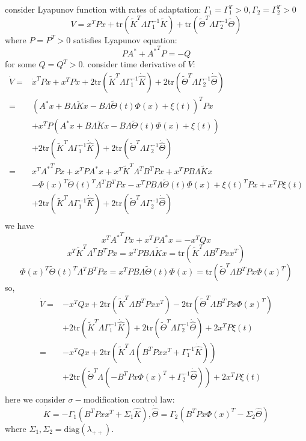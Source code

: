       consider  Lyapunov function with rates of adaptation: $\Gamma_1=\Gamma_1^{T}>0,\Gamma_2=\Gamma_2^{T}>0$
    $$V= x^T P x + \text{tr} (  \tilde{K}^T\Lambda \Gamma_1^{-1}  \tilde{K}) + \text{tr} (\tilde{\Theta}^T \Lambda\Gamma_2^{-1} \tilde{\Theta}  )$$
    where $P=P^{T}>0$ satisfies Lyapunov equation:
    \[
P A^* + {A^*}^T P = -Q
\]for some $Q=Q^{T}>0$.
consider time derivative of $V$:
\begin{align*}
    \dot{V}=&\dot{x}^T P x+ x^T P \dot{x}+ 2\text{tr} (  \tilde{K}^T\Lambda \Gamma_1^{-1}  \dot{\hat{K}})+2\text{tr} (  \tilde{\Theta}^T \Lambda\Gamma_2^{-1}  \dot{\hat{\Theta}})\\
    =&(A^*x+B\Lambda\tilde{K}x-B\Lambda \tilde \Theta(t)\Phi(x)+\xi(t))^TPx\\
    &+x^TP(A^*x+B\Lambda\tilde{K}x-B\Lambda \tilde \Theta(t)\Phi(x)+\xi(t))\\
    &+2\text{tr} (  \tilde{K}^T \Lambda\Gamma_1^{-1}  \dot{\hat{K}})+2\text{tr} (  \tilde{\Theta}^T \Lambda\Gamma_2^{-1}  \dot{\hat{\Theta}})\\
    =&x^T {A^*}^TPx+x^TPA^*x
    +x^T\tilde{K}^T\Lambda^TB^TPx+x^TPB\Lambda\tilde{K}x\\
    &-\Phi(x)^T\tilde\Theta(t)^T\Lambda^TB^TPx-x^TPB\Lambda \tilde \Theta(t)\Phi(x)+\xi(t)^TPx+x^TP\xi(t)\\
    &+2\text{tr} (  \tilde{K}^T \Lambda\Gamma_1^{-1}  \dot{\hat{K}})+2\text{tr} (  \tilde{\Theta}^T \Lambda\Gamma_2^{-1}  \dot{\hat{\Theta}})\\
\end{align*}
we have
$$x^T {A^*}^TPx+x^TPA^*x=-x^TQx$$
$$x^T\tilde{K}^T\Lambda^TB^TPx=x^TPB\Lambda\tilde{K}x
    =\text{tr}(\tilde{K}^T\Lambda B^TPxx^T)$$
$$\Phi(x)^T\tilde\Theta(t)^T\Lambda^TB^TPx=x^TPB\Lambda \tilde \Theta(t)\Phi(x)
    =\text{tr}(\tilde{\Theta}^T\Lambda B^TPx\Phi(x)^T)$$
    so,
\begin{align*}
    \dot{V}=&-x^TQx+2\text{tr}(\tilde{K}^T\Lambda B^TPxx^T)-2\text{tr}(\tilde{\Theta}^T\Lambda B^TPx\Phi(x)^T)
    \\
    &+2\text{tr} (  \tilde{K}^T \Lambda\Gamma_1^{-1}  \dot{\hat{K}})+2\text{tr} (  \tilde{\Theta}^T \Lambda\Gamma_2^{-1}  \dot{\hat{\Theta}})+2x^TP\xi(t)\\
    =&-x^TQx+2\text{tr}(\tilde{K}^T\Lambda( B^TPxx^T+\Gamma_1^{-1}  \dot{\hat{K}}))\\&+2\text{tr}(\tilde{\Theta}^T\Lambda(- B^TPx\Phi(x)^T+\Gamma_2^{-1}  \dot{\hat{\Theta}}))+2x^TP\xi(t)\\
\end{align*}
here we consider $\sigma-$modification control law:
$$\dot{\hat{K}}=-\Gamma_1(B^TPxx^T+\Sigma_1\hat{K}),\dot{\hat{\Theta}}=\Gamma_2(B^TPx\Phi(x)^T-\Sigma_2\hat{\Theta})$$where $\Sigma_1,\Sigma_2=\text{diag}(\lambda_{++})$.

